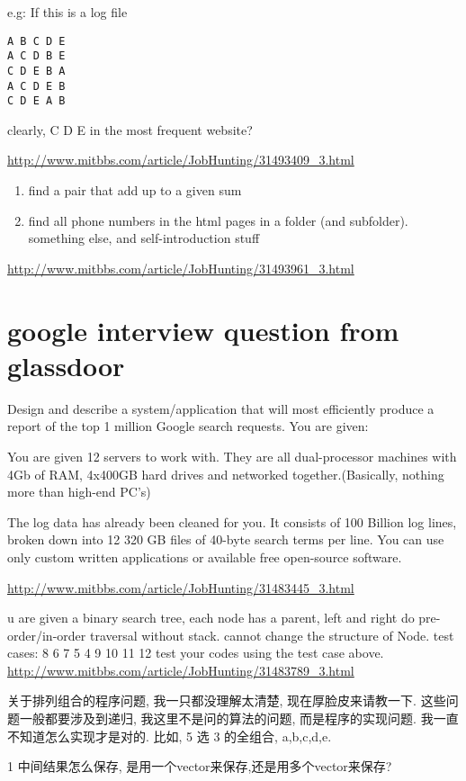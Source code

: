 \documentclass[12pt]{book}
\begin{document}
e.g: If this is a log file
\lstset{language=java,label= ,caption= ,numbers=none}
\begin{lstlisting}
A B C D E
A C D B E
C D E B A
A C D E B
C D E A B
\end{lstlisting}

clearly, C D E in the most frequent website?

\url{http://www.mitbbs.com/article/JobHunting/31493409_3.html}

\begin{enumerate}
\item find a pair that add up to a given sum

\item find all phone numbers in the html pages in a folder (and subfolder). something else, and self-introduction stuff
\end{enumerate}

\url{http://www.mitbbs.com/article/JobHunting/31493961_3.html}
\chapter{google interview question from glassdoor}
\label{sec-15}
Design and describe a system/application that will most efficiently produce 
a report of the top 1 million Google search requests. You are given:

You are given 12 servers to work with. They are all dual-processor machines 
with 4Gb of RAM, 4x400GB hard drives and networked together.(Basically, 
nothing more than high-end PC's)

The log data has already been cleaned for you. It consists of 100 Billion 
log lines, broken down into 12 320 GB files of 40-byte search terms per line.
You can use only custom written applications or available free open-source 
software.

\url{http://www.mitbbs.com/article/JobHunting/31483445_3.html}

u are given a binary search tree,
each node has a parent, left and right
do pre-order/in-order traversal without stack.
cannot change the structure of Node.
test cases: 8  6  7  5  4  9  10  11  12
test your codes using the test case above.
\url{http://www.mitbbs.com/article/JobHunting/31483789_3.html}

关于排列组合的程序问题, 我一只都没理解太清楚, 现在厚脸皮来请教一下. 这些问题一般都要涉及到递归, 我这里不是问的算法的问题, 而是程序的实现问题. 我一直不知道怎么实现才是对的. 比如, 5 选 3 的全组合, a,b,c,d,e. 

1 中间结果怎么保存, 是用一个vector来保存,还是用多个vector来保存?
\end{document}
